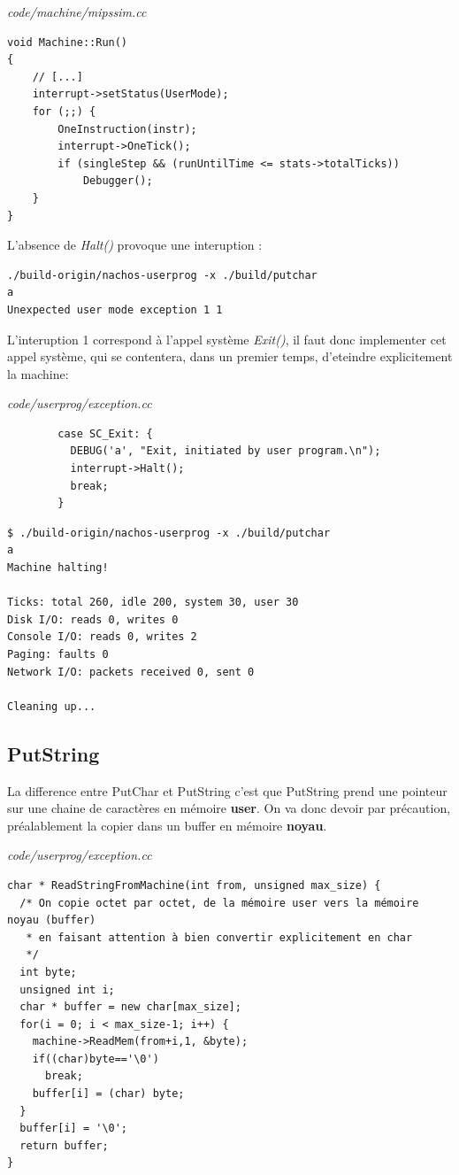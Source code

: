 \documentclass[a4paper,10pt]{article}
\begin{document}
\textit{code/machine/mipssim.cc}
\begin{lstlisting}
void Machine::Run()
{
    // [...]
    interrupt->setStatus(UserMode);
    for (;;) {
        OneInstruction(instr);
        interrupt->OneTick();
        if (singleStep && (runUntilTime <= stats->totalTicks))
            Debugger();
    }
}
\end{lstlisting}

L'absence de \textit{Halt()} provoque une interuption :

\begin{lstlisting}
./build-origin/nachos-userprog -x ./build/putchar
a
Unexpected user mode exception 1 1
\end{lstlisting}

L'interuption 1 correspond à l'appel système \textit{Exit()}, il faut
donc implementer cet appel système, qui se contentera, dans un premier temps,
d'eteindre explicitement la machine:

\textit{code/userprog/exception.cc}
\begin{lstlisting}
        case SC_Exit: {
          DEBUG('a', "Exit, initiated by user program.\n");
          interrupt->Halt();
          break;
        }
\end{lstlisting}

\begin{lstlisting}
$ ./build-origin/nachos-userprog -x ./build/putchar
a
Machine halting!

Ticks: total 260, idle 200, system 30, user 30
Disk I/O: reads 0, writes 0
Console I/O: reads 0, writes 2
Paging: faults 0
Network I/O: packets received 0, sent 0

Cleaning up...
\end{lstlisting}

\subsection{PutString}
La difference entre PutChar et PutString c'est que PutString prend une pointeur
sur une chaine de caractères en mémoire \textbf{user}. On va donc devoir par
précaution, préalablement la copier dans un buffer en mémoire \textbf{noyau}.

\textit{code/userprog/exception.cc}
\begin{lstlisting}
char * ReadStringFromMachine(int from, unsigned max_size) {
  /* On copie octet par octet, de la mémoire user vers la mémoire noyau (buffer)
   * en faisant attention à bien convertir explicitement en char
   */
  int byte;
  unsigned int i;
  char * buffer = new char[max_size];
  for(i = 0; i < max_size-1; i++) {
    machine->ReadMem(from+i,1, &byte);
    if((char)byte=='\0')
      break;
    buffer[i] = (char) byte;
  }
  buffer[i] = '\0';
  return buffer;
}
\end{lstlisting}
\end{document}
